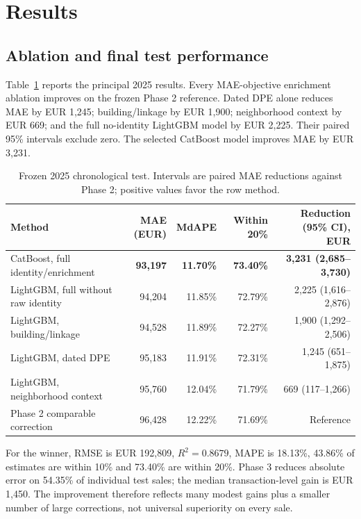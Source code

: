 \documentclass[11pt,a4paper]{article}
\begin{document}
\section{Results}

\subsection{Ablation and final test performance}

Table~\ref{tab:results} reports the principal 2025 results. Every MAE-objective
enrichment ablation improves on the frozen Phase 2 reference. Dated DPE alone
reduces MAE by EUR 1,245; building/linkage by EUR 1,900; neighborhood context by
EUR 669; and the full no-identity LightGBM model by EUR 2,225. Their paired 95\%
intervals exclude zero. The selected CatBoost model improves MAE by EUR 3,231.

\begin{table}[H]
\centering
\caption{Frozen 2025 chronological test. Intervals are paired MAE reductions
against Phase 2; positive values favor the row method.}
\label{tab:results}
\small
\begin{tabular}{lrrrr}
\toprule
Method & MAE (EUR) & MdAPE & Within 20\% & Reduction (95\% CI), EUR \\
\midrule
CatBoost, full identity/enrichment & \textbf{93,197} & \textbf{11.70\%} & \textbf{73.40\%} & \textbf{3,231 (2,685--3,730)} \\
LightGBM, full without raw identity & 94,204 & 11.85\% & 72.79\% & 2,225 (1,616--2,876) \\
LightGBM, building/linkage & 94,528 & 11.89\% & 72.27\% & 1,900 (1,292--2,506) \\
LightGBM, dated DPE & 95,183 & 11.91\% & 72.31\% & 1,245 (651--1,875) \\
LightGBM, neighborhood context & 95,760 & 12.04\% & 71.79\% & 669 (117--1,266) \\
Phase 2 comparable correction & 96,428 & 12.22\% & 71.69\% & Reference \\
\bottomrule
\end{tabular}
\end{table}

For the winner, RMSE is EUR 192,809, $R^2=0.8679$, MAPE is 18.13\%, 43.86\%
of estimates are within 10\% and 73.40\% are within 20\%. Phase 3 reduces
absolute error on 54.35\% of individual test sales; the median transaction-level
gain is EUR 1,450. The improvement therefore reflects many modest gains plus a
smaller number of large corrections, not universal superiority on every sale.
\end{document}
